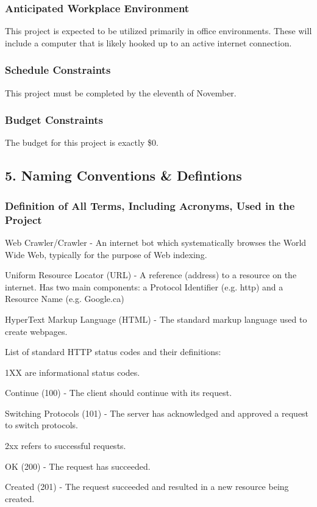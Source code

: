 \documentclass[titlepage]{article}
\begin{document}
\subsubsection*{Anticipated Workplace Environment}
This project is expected to be utilized primarily in office environments. These will include a computer that is likely hooked up to an active internet connection.

\subsubsection*{Schedule Constraints}
This project must be completed by the eleventh of November.

\subsubsection*{Budget Constraints}
The budget for this project is exactly \$0.


\subsection{5. Naming Conventions \& Defintions}

\subsubsection*{Definition of All Terms, Including Acronyms, Used in the Project}
Web Crawler/Crawler - An internet bot which systematically browses the World Wide Web, typically for the purpose of Web indexing.

Uniform Resource Locator (URL) - A reference (address) to a resource on the internet. Has two main components: a Protocol Identifier (e.g. http) and a Resource Name (e.g. Google.ca)

HyperText Markup Language (HTML) - The standard markup language used to create webpages.

List of standard HTTP status codes and their definitions:

1XX are informational status codes.

Continue (100) - The client should continue with its request.

Switching Protocols (101) - The server has acknowledged and approved a request to switch protocols.

2xx refers to successful requests.

OK (200) - The request has succeeded.

Created (201) - The request succeeded and resulted in a new resource being created.
\end{document}
